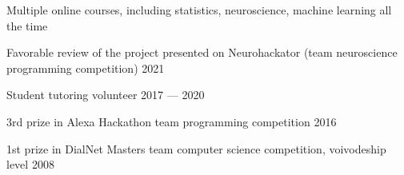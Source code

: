 Multiple online courses, including statistics, neuroscience, machine learning \hfill all the time

Favorable review of the project presented on Neurohackator (team neuroscience programming competition) \hfill 2021

Student tutoring volunteer \hfill 2017 --- 2020
 
3rd prize in Alexa Hackathon team programming competition \hfill 2016

1st prize in DialNet Masters team computer science competition, voivodeship level \hfill 2008
